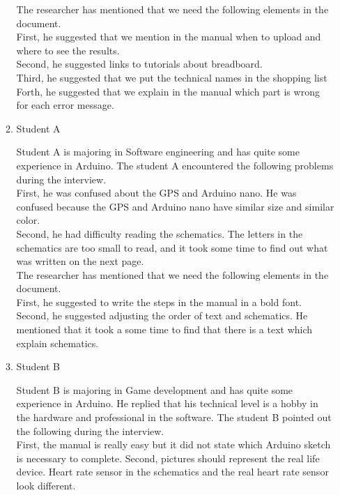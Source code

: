 \documentclass[conference]{IEEEtran}
\begin{document}
\begin{enumerate}
\begin{enumerate}
						The researcher has mentioned that we need the following elements in the document.\\

						First, he suggested that we mention in the manual when to upload and where to see the results. \\
						Second, he suggested links to tutorials about breadboard.\\
						Third, he suggested that we put the technical names in the shopping list\\
						Forth, he suggested that we explain in the manual which part is wrong for each error message.\\

					\item Student A

						Student A is majoring in Software engineering and has  quite some experience in Arduino. The student A encountered the following problems during the interview.\\

						First, he was confused about the GPS and Arduino nano. He was confused because the GPS and Arduino nano have similar size and similar color.\\
						Second, he had difficulty reading the schematics. The letters in the schematics are too small to read, and it took some time to find out what was written on the next page.\\

						The researcher has mentioned that we need the following elements in the document.\\

						First, he suggested to write the steps in the manual in a bold font.\\
						Second, he suggested adjusting the order of text and schematics. He mentioned that it took a some time to find that there is a text which explain schematics. 

					\item Student B

						Student B is majoring in Game development and has  quite some experience in Arduino. He replied that his technical level is a hobby in the hardware and professional in the software. The student B pointed out the following during the interview.\\

						First, the manual is really easy but it did not state which Arduino sketch is necessary to complete.
						Second, pictures should represent the real life device. Heart rate sensor in the schematics and the real heart rate sensor look different.


\end{enumerate}
\end{enumerate}
\end{document}
